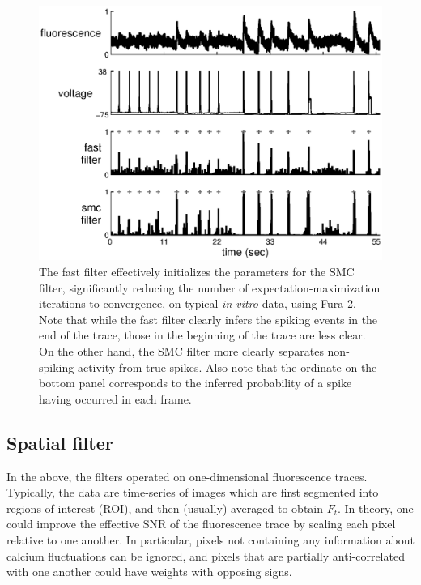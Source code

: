 \documentclass{article}
\newcommand{\foopsi}{fast }
\begin{document}
\begin{figure}[h!]
\centering \includegraphics[width=.9\linewidth]{smc_init_c12}
\caption[\foopsi filter can initialize Wiener filter]{The \foopsi filter effectively initializes the parameters for the SMC filter, significantly reducing the number of expectation-maximization iterations to convergence, on typical \emph{in vitro} data, using Fura-2.  Note that while the \foopsi filter clearly infers the spiking events in the end of the trace, those in the beginning of the trace are less clear.  On the other hand, the SMC filter more clearly separates non-spiking activity from true spikes.  Also note that the ordinate on the bottom panel corresponds to the inferred probability of a spike having occurred in each frame.} \label{fig:smc_init}
\end{figure}

\subsection{Spatial filter} \label{sec:results:spatial}

In the above, the filters operated on one-dimensional fluorescence traces. Typically, the data are time-series of images which are first segmented into regions-of-interest (ROI), and then (usually) averaged to obtain $F_t$.  In theory, one could improve the effective SNR of the fluorescence trace by scaling each pixel relative to one another.  In particular, pixels not containing any information about calcium fluctuations can be ignored, and pixels that are partially anti-correlated with one another could have weights with opposing signs.  
\end{document}
